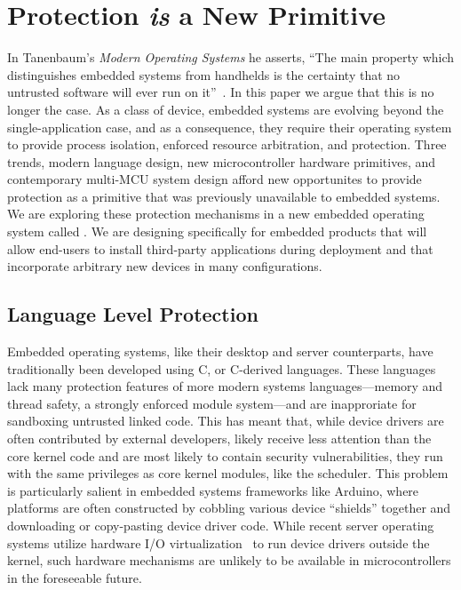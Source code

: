 \section{Protection \emph{is} a New Primitive}

In Tanenbaum's \emph{Modern Operating Systems} he asserts, ``The main property
which distinguishes embedded systems from handhelds is the certainty that no
untrusted software will ever run on it''~\cite{tanenbaum}. In this paper we
argue that this is no longer the case. As a class of device, embedded systems
are evolving beyond the single-application case, and as a consequence, they
require their operating system to provide process isolation, enforced resource
arbitration, and protection.
%
Three trends, modern language design, new microcontroller hardware primitives,
and contemporary multi-MCU system design afford new opportunites to provide
protection as a primitive that was previously unavailable to embedded systems.
We are exploring these protection mechanisms in a new embedded operating system
called \name. We are designing \name specifically for embedded products that
will allow end-users to install third-party applications during deployment and
that incorporate arbitrary new devices in many configurations.

\subsection{Language Level Protection}

Embedded operating systems, like their desktop and server counterparts, have
traditionally been developed using C, or C-derived languages. These languages
lack many protection features of more modern systems languages---memory and
thread safety, a strongly enforced module system---and are inapproriate for
sandboxing untrusted linked code. This has meant that, while device drivers are
often contributed by external developers, likely receive less attention than the
core kernel code and are most likely to contain security vulnerabilities, they
run with the same privileges as core kernel modules, like the scheduler. This
problem is particularly salient in embedded systems frameworks like Arduino,
where platforms are often constructed by cobbling various device ``shields''
together and downloading or copy-pasting device driver code. While recent server
operating systems utilize hardware I/O virtualization~\cite{arrakis:osdi2014,
ix:osdi2014} to run device drivers outside the kernel, such hardware mechanisms
are unlikely to be available in microcontrollers in the foreseeable future.


